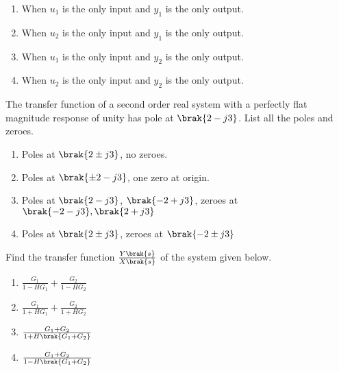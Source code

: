     \begin{enumerate}
        \item When $u_1$ is the only input and $y_1$ is the only output.
        \item When $u_2$ is the only input and $y_1$ is the only output.
        \item When $u_1$ is the only input and $y_2$ is the only output.
        \item When $u_2$ is the only input and $y_2$ is the only output.
    \end{enumerate}

    \item The transfer function of a second order real system with a perfectly flat magnitude response of unity has pole at $\brak{2-j3}$. List all the poles and zeroes.
        \begin{enumerate}
            \item Poles at $\brak{2 \pm j3}$, no zeroes.
            \item Poles at $\brak{\pm 2 - j3}$, one zero at origin.
            \item Poles at $\brak{2 - j3}$, $\brak{-2 + j3}$, zeroes at $\brak{-2-j3}, \brak{2+j3}$
            \item Poles at $\brak{2 \pm j3}$, zeroes at $\brak{-2 \pm j3}$
        \end{enumerate}

    \item Find the transfer function $\frac{Y\brak{s}}{X\brak{s}}$ of the system given below.
    
        \begin{figure}[H]
            \centering
            
            \caption{}
            \label{fig64}
        \end{figure}

        \begin{enumerate}
            \item $\frac{G_1}{1-H G_1} + \frac{G_2}{1-H G_2}$
            \item $\frac{G_1}{1+H G_1} + \frac{G_2}{1+H G_2}$
            \item $\frac{G_1 + G_2}{ 1 + H \brak{G_1 + G_2}}$
            \item $\frac{G_1 + G_2}{ 1 - H \brak{G_1 + G_2}}$
        \end{enumerate}

